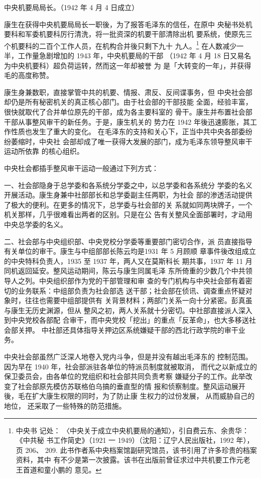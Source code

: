 中央机要局局长。（1942 年 4 月 4 日成立）

康生在获得中央机要局局长一职後，为了报答毛泽东的信任，在原中 央秘书处机
要科和军委机要科厉行清洗，将一批资深的机要干部清除出机 要系统，使原先三
个机要科的二百个工作人员，在机构合并後只剩下九十 九人。\footnote{中央书
记处： 〈中央关于成立中央机要局的通知〉，引自费云东、余贵华： 《中共秘
书工作简史》（1921 一 1949）（沈阳：辽宁人民出版社，1992 年），页 206、
209. 此书作者系中央档案馆副研究馆员，该书引用了许多珍贵的档案 资料，其中
有不少是第一次披露。该书在出版前曾征求过中共机要工作元老王首道和童小鹏的
意见。} 在人数减少一半，工作量急剧增加的 1943 年，中央机要局的干部
（1942 年 4 月 18 日又易名为中央机要科）超负荷运转，然而这一年却被誉 为
是「大转变的一年」，并获得毛的高度称赞。

康生身兼数职，直接掌管中共的机要、情报、肃反、反间谍事务，但
中央社会部却仍是所有秘密机关的真正核心部门。由于社会部的干部技能
全面，经验丰富，很快就取代了合并单位原先的干部，成为各主要科室的
骨干。康生并布置社会部干部从事整风审干的新任务。于是，康生机关的
势力在 1942 年後迅速膨胀，其工作性质也发生了重大的变化。
在毛泽东的支持和关心下，正当中共中央各部委纷纷萎缩时，中央社
会部却成了唯一获得大发展的部门，成为毛泽东领导整风审干运动所依靠
的核心组织。

中央杜会都插手整风审干运动一般通过下列方式：

一、社会部隐身于总学委和各系统分学委之中，以总学委和各系统分
学委的名义开展活动。康生身兼中社部部长和总学委副主任两职，为社会
部的渗透活动提供了极大的便利。在更多的情况下，总学委与社会部的关
系就如同两块牌子，一个机关那样，几乎很难看出两者的区别。只是在公
告有关整风全面部署时，才动用中央总学委的名义。

二、社会部与中央组织部、中央党校分学委等重要部门密切合作，派
员直接指导有关单位的审干。康生与中组部部长陈云均是1931 年 5 月顾顺
章事件後改组成立的中央特科负责人，1935 至 1937 年，两人又在莫斯科长
期共事，1937 年 11 月同机返回延安。整风运动期间，陈云与康生同属毛泽
东所倚重的少数几个中共领导人之列。中央组织部作为党的干部管理和审
查的专门机构与中央社会部有着密切的业务联系：中组部负责为社会部选
送干部；社会部在侦讯、调查重点怀疑对象时，往往也需要中组部提供有
关背景材料；两部门关系一向十分紧密。彭真虽与康生无历史渊源，但从
整风之初，两人关系就十分密切。中社部直接派人深入到中央党校各部配
合审干，而中央党校「挖出」的重点「反革命」，也大多移送社会部关押。
中社部还具体指导关押边区系统嫌疑干部的西北行政学院的审干业务。

中央社会部虽然广泛深人地卷入党内斗争，但是并没有越出毛泽东的
控制范围。因为早在 1940 年，社会部派驻各单位的特派员制度就被取消，
而代之以新成立的保卫委员会，由各单位的党组织和社会部共同负责考察
嫌疑分子的工作。此举改变了社会部原先模仿苏联格伯乌搞的垂直型的情
报和侦察制度。整风运动展开後，毛在扩大康生权限的同时，为了防止康
生权力的过份发展，
从而威胁自己的地位，
还采取了一些特殊的防范措施。

